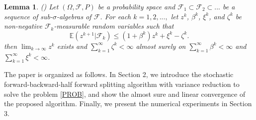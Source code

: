 \documentclass[a4paper,12pt]{article}
\newtheorem{lem}[dfn]{Lemma}
\theoremstyle{definition}
\begin{document}
\begin{lem}\label{Robbins} {\rm(\cite[Theorem 1]{Robbins})}
Let $(\Omega, \mathcal{F}, P)$ be a probability space and $\mathcal{F}_1 \subset \mathcal{F}_2 \subset ...$ be a sequence of sub-$\sigma$-algebras of $\mathcal{F}$. For each $k=1,2,...,$ let $z^k$, $\beta^k$, $\xi^k$, and $\zeta^k$ be non-negative $\mathcal{F}_k$-measurable random variables such that
\begin{equation*}
\mathbb{E}(z^{k+1} | \mathcal{F}_k) \leq (1+\beta^k)z^k+\xi^k-\zeta^k.
\end{equation*}
then $\lim_{k \rightarrow \infty}z^k$ exists and $\sum_{k=1}^{\infty}\zeta^k < \infty$ almost surely on  $\sum_{k=1}^{\infty} \beta^k < \infty$ and $\sum_{k=1}^{\infty} \xi^k < \infty$.
\end{lem}
The paper is organized as follows. In Section 2, we introduce the stochastic forward-backward-half forward splitting algorithm with variance reduction to solve the problem \eqref{PROB}, and show the almost sure and linear convergence of the proposed algorithm. Finally, we present the numerical experiments in Section 3.
\end{document}
